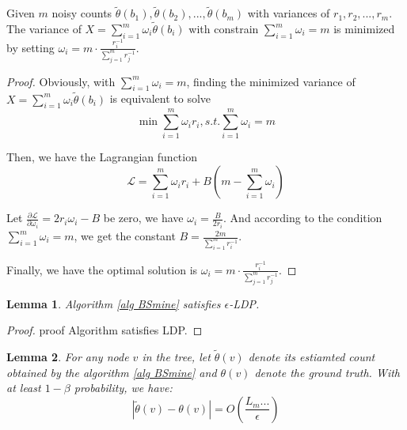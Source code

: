 \documentclass[conference]{IEEEtran}
\begin{document}
\begin{theorem}\label{minimized noisy count}
Given $m$ noisy counts $\tilde{\theta}(b_1),\tilde{\theta}(b_2),...,\tilde{\theta}(b_m)$ with variances of $r_1,r_2,...,r_m$. The variance of $X = \sum_{i=1}^{m}\omega_i\tilde{\theta}(b_i)$ with constrain $\sum_{i=1}^{m}\omega_i = m$ is minimized by setting $\omega_i = m \cdot \frac{r_i^{-1} }{\sum_{j=1}^{m} r_j^{-1}}$.
\end{theorem}

\newtheorem*{proof}{}
\begin{proof}
Obviously, with $\sum_{i=1}^{m}\omega_i = m$, finding the minimized variance of $X = \sum_{i=1}^{m}\omega_i\tilde{\theta}(b_i)$ is equivalent to solve
\begin{equation}
\min{\sum_{i=1}^{m}\omega_i r_i , s.t. \sum_{i=1}^{m}\omega_i = m } \label{weigh mine}
\end{equation}

Then, we have the Lagrangian function
$$\mathcal{L} = \sum_{i=1}^{m}\omega_i r_i + B(m - \sum_{i=1}^{m}\omega_i)$$

Let $\frac{\partial {\mathcal{L}}}{ \partial{\omega_i}} = 2r_i \omega_i - B$ be zero, we have $\omega_i = \frac{B}{2r_i}$. And according to the condition $\sum_{i=1}^{m}\omega_i = m$, we get the constant $B = \frac{2m}{\sum_{i=1}^{m} r_i^{-1}}$.

Finally, we have the optimal solution is $\omega_i = m \cdot \frac{r_i^{-1} }{\sum_{j=1}^{m} r_j^{-1}}$.

\end{proof}



\newtheorem{lemma}{Lemma}[section]
\begin{lemma}
Algorithm \ref{alg BSmine} satisfies $\epsilon$-LDP.
\end{lemma}

\begin{proof}
proof Algorithm satisfies LDP.
\end{proof}

\begin{lemma}
For any node $v$ in the tree, let $\tilde{\theta}(v)$ denote its estiamted count obtained by the algorithm \ref{alg BSmine} and $\theta (v)$ denote the ground truth. With at least $1-\beta$ probability, we have:
$$|\tilde{\theta}(v) - \theta(v) | = O \left(\frac{L_m...}{\epsilon} \right)$$
\end{lemma}
\end{document}
